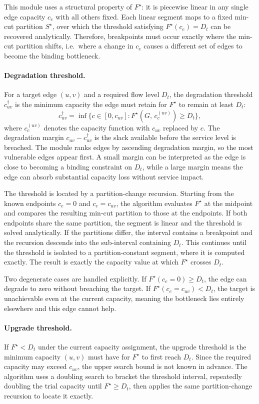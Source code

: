 \documentclass[12pt]{report}
\begin{document}
This module uses a structural property of $F^\star$: it is piecewise linear in any single edge capacity $c_e$ with all others fixed. Each linear segment maps to a fixed min-cut partition $S^\star$, over which the threshold satisfying $F^\star(c_e) = D_t$ can be recovered analytically. Therefore, breakpoints must occur exactly where the min-cut partition shifts, i.e.\ where a change in $c_e$ causes a different set of edges to become the binding bottleneck.

\paragraph{Degradation threshold.}
For a target edge $(u,v)$ and a required flow level $D_t$, the degradation threshold $c^\dagger_{uv}$ is the minimum capacity the edge must retain for $F^\star$ to remain at least $D_t$:
\[
c^\dagger_{uv} = \inf\bigl\{c \in [0, c_{uv}] : 
F^\star(G,\, c^{(uv)}_c) \geq D_t \bigr\},
\]
where $c^{(uv)}_c$ denotes the capacity function with $c_{uv}$ replaced by $c$. The degradation margin $c_{uv} - c^\dagger_{uv}$ is the slack available before the service level is breached. The module ranks edges by ascending degradation margin, so the most vulnerable edges appear first. A small margin can be interpreted as the edge is close to becoming a binding constraint on $D_t$, while a large margin means the edge can absorb substantial capacity loss without service impact.

The threshold is located by a partition-change recursion. Starting from the known endpoints $c_e = 0$ and $c_e = c_{uv}$, the algorithm evaluates $F^\star$ at the midpoint and compares the resulting min-cut partition to those at the endpoints. If both endpoints share the same partition, the segment is linear and the threshold is solved analytically. If the partitions differ, the interval contains a breakpoint and the recursion descends into the sub-interval containing $D_t$. This continues until the threshold is isolated to a partition-constant segment, where it is computed exactly. The result is exactly the capacity value at which $F^\star$ crosses $D_t$.

Two degenerate cases are handled explicitly. If $F^\star(c_e = 0) \geq D_t$, the edge can degrade to zero without breaching the target. If $F^\star(c_e = c_{uv}) < D_t$, the target is unachievable even at the current capacity, meaning the bottleneck lies entirely elsewhere and this edge cannot help.

\paragraph{Upgrade threshold.}
If $F^\star < D_t$ under the current capacity assignment, the upgrade threshold is the minimum capacity $(u,v)$ must have for $F^\star$ to first reach $D_t$. Since the required capacity may exceed $c_{uv}$, the upper search bound is not known in advance. The algorithm uses a doubling search to bracket the threshold interval, repeatedly doubling the trial capacity until $F^\star \geq D_t$, then applies the same partition-change recursion to locate it exactly.
\end{document}
